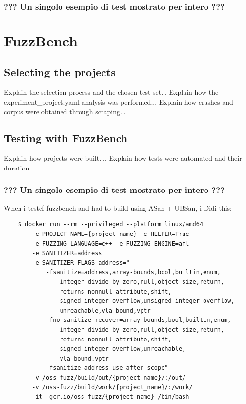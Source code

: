 \newpage
\subsubsection{??? Un singolo esempio di test mostrato per intero ???}

\newpage
\section{FuzzBench}
\subsection{Selecting the projects}
Explain the selection process and the chosen test set...
\newline \newline
Explain how the experiment\_project.yaml analysis was performed...
\newline \newline
Explain how crashes and corpus were obtained through scraping...
\newline \newline
\subsection{Testing with FuzzBench}
Explain how projects were built....
\newline \newline
Explain how tests were automated and their duration...
\subsubsection{??? Un singolo esempio di test mostrato per intero ???}


\newpage
When i testef fuzzbench and had to build using ASan + UBSan, i Didi this:
\begin{verbatim}
    $ docker run --rm --privileged --platform linux/amd64 
        -e PROJECT_NAME={project_name} -e HELPER=True 
        -e FUZZING_LANGUAGE=c++ -e FUZZING_ENGINE=afl 
        -e SANITIZER=address 
        -e SANITIZER_FLAGS_address="
            -fsanitize=address,array-bounds,bool,builtin,enum,
                integer-divide-by-zero,null,object-size,return,
                returns-nonnull-attribute,shift,
                signed-integer-overflow,unsigned-integer-overflow,
                unreachable,vla-bound,vptr
            -fno-sanitize-recover=array-bounds,bool,builtin,enum,
                integer-divide-by-zero,null,object-size,return,
                returns-nonnull-attribute,shift,
                signed-integer-overflow,unreachable,
                vla-bound,vptr 
            -fsanitize-address-use-after-scope" 
        -v /oss-fuzz/build/out/{project_name}/:/out/  
        -v /oss-fuzz/build/work/{project_name}/:/work/
        -it  gcr.io/oss-fuzz/{project_name} /bin/bash
\end{verbatim}

